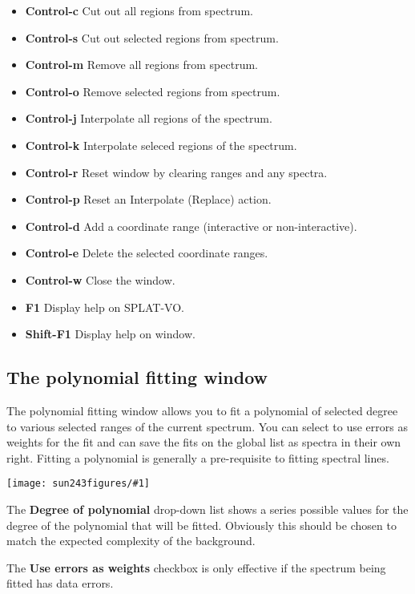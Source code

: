 \documentclass[twoside,11pt]{article}
\newcommand{\htmladdimg}[1]{}
\newcommand{\latexhtml}[2]{#1}
\renewcommand{\_}{\texttt{\symbol{95}}}
\newcommand{\SPLAT}{\textsf{SPLAT-VO}}
\newcommand{\mainfigure}[1]
{\begin{center}
 \latexhtml{\texttt{[image: sun243\_figures/\#1]}}{\htmladdimg{#1.gif}}
 \end{center}
}
\newcommand{\labelitem}[1]{\textbf{#1}}
\begin{document}
\begin{itemize}
\item \labelitem{Control-c} Cut out all regions from spectrum.
\item \labelitem{Control-s} Cut out selected regions from spectrum.
\item \labelitem{Control-m} Remove all regions from spectrum.
\item \labelitem{Control-o} Remove selected regions from spectrum.
\item \labelitem{Control-j} Interpolate all regions of the spectrum.
\item \labelitem{Control-k} Interpolate seleced regions of the spectrum.
\item \labelitem{Control-r} Reset window by clearing ranges and any spectra.
\item \labelitem{Control-p} Reset an Interpolate (Replace) action.

\item \labelitem{Control-d} Add a coordinate range (interactive or non-interactive).
\item \labelitem{Control-e} Delete the selected coordinate ranges.

\item \labelitem{Control-w} Close the window.
\item \labelitem{F1} Display help on \SPLAT.
\item \labelitem{Shift-F1} Display help on window.
\end{itemize}


\newpage
\subsection{The polynomial fitting window}

The polynomial fitting window allows you to fit a polynomial of selected
degree to various selected ranges of the current spectrum. You can select to
use errors as weights for the fit and can save the fits on the global list as
spectra in their own right. Fitting a polynomial is generally a pre-requisite
to fitting spectral lines.

\mainfigure{polynomialfitwindow}

The \labelitem{Degree of polynomial} drop-down list shows a series
possible values for the degree of the polynomial that will be
fitted. Obviously this should be chosen to match the expected
complexity of the background.

The \labelitem{Use errors as weights} checkbox is only effective if
the spectrum being fitted has data errors.
\end{document}
